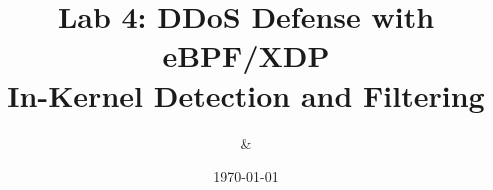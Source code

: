 \documentclass[
numbers=noenddot,
fontsize=11pt,
paper=a4,
oneside,
titlepage,
bibliography=totoc,
chapterprefix=false,
DIV=calc,
headheight=14pt,
footheight=14pt,
]{scrbook}
\title{Lab 4: DDoS Defense with eBPF/XDP\\[0.4em]\Large In-Kernel Detection and Filtering}
\author{\authorA \& \authorB}
\date{\today}
\begin{document}
	
	\frontmatter
	
	
	\tableofcontents
	
	
	
	
{\footnotesize\setlength{\parskip}{0pt}
\listoffigures
\listoftables
\lstlistoflistings}
	
	\mainmatter
	
	
	\FloatBarrier
	\FloatBarrier
	\FloatBarrier
	
	\FloatBarrier
	
	
	
	\begin{appendices}
		
	\end{appendices}
	
	
	
	\backmatter
	
	\printbibliography
	
	\clearpage
	
	
	
\end{document}
